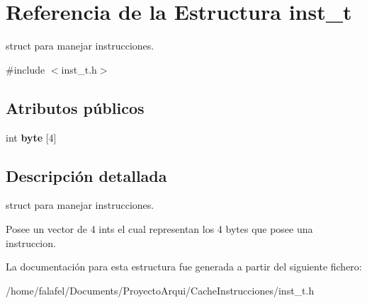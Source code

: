 \hypertarget{structinst__t}{}\section{Referencia de la Estructura inst\+\_\+t}
\label{structinst__t}


struct para manejar instrucciones.  




{\ttfamily \#include $<$inst\+\_\+t.\+h$>$}

\subsection*{Atributos públicos}
\begin{DoxyCompactItemize}
\item 
\mbox{\label{structinst__t_a4f6de678148c72ddfed41920a5ee908d}} 
int {\bfseries byte} \mbox{[}4\mbox{]}
\end{DoxyCompactItemize}


\subsection{Descripción detallada}
struct para manejar instrucciones. 

Posee un vector de 4 ints el cual representan los 4 bytes que posee una instruccion. 

La documentación para esta estructura fue generada a partir del siguiente fichero\+:\begin{DoxyCompactItemize}
\item 
/home/falafel/\+Documents/\+Proyecto\+Arqui/\+Cache\+Instrucciones/inst\+\_\+t.\+h\end{DoxyCompactItemize}
